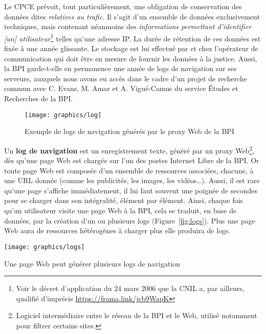 \documentclass[symmetric,justified,marginals=raggedouter]{tufte-book}
\begin{document}
Le CPCE prévoit, tout particulièrement, une obligation de conservation des données dites \og\textit{relatives au trafic}\fg{}. Il s'agit d'un ensemble de données exclusivement techniques, mais contenant néanmoins des \og\textit{informations permettant d'identifier [un] utili\-sateur}\fg{}\footnote{\RaggedOuter Voir le décret d'application du 24 mars 2006 que la CNIL a, par ailleurs, qualifié d'imprécis \url{https://frama.link/jcb9WapK}} telles qu'une adresse IP. La durée de rétention de ces données est fixée à une année glissante. Le stockage est lui effectué par et chez l'opé\-rateur de communication qui doit être en mesure de fournir les données à la justice. Aussi, la BPI garde-t-elle en permanence une année de logs de navigation sur ses serveurs, auxquels nous avons eu accès dans le cadre d'un projet de recherche commun avec C. Evans, M. Amar et A. Vigué-Camus du service Études et Recherches de la BPI.

\begin{figure*}
  \texttt{[image: graphics/log]}
  \caption{Exemple de logs de navigation générés par le proxy Web de la BPI}
  \label{fig:log}
\end{figure*}

\noindent Un \textbf{log de navigation} est un enregistrement texte, généré par un proxy Web\footnote{\RaggedOuter Logiciel intermédiaire entre le réseau de la BPI et le Web, utilisé notamment pour filtrer certains sites.}, dès qu'une page Web est chargée sur l'un des postes Internet Libre de la BPI. Or toute page Web est composée d'un ensemble de ressources associées, chacune, à une URL donnée (comme les publicités, les images, les vidéos\ldots{}). Aussi, il est rare qu'une page s'affiche immédiatement, il lui faut souvent une poignée de secondes pour se charger dans son intégralité, élément par élément. Ainsi, chaque fois qu'un utilisateur visite une page Web à la BPI, cela se traduit, en base de données, par la création d'un ou plusieurs logs (Figure~\ref{fig:logs}). Plus une page Web aura de ressources hétérogènes à charger plus elle produira de logs.

\begin{marginfigure}%
  \texttt{[image: graphics/logs]}
  \vspace*{0.2cm}  
  \caption{Une page Web peut générer plusieurs logs de navigation}
  \label{fig:logs}
\end{marginfigure} 
\end{document}
